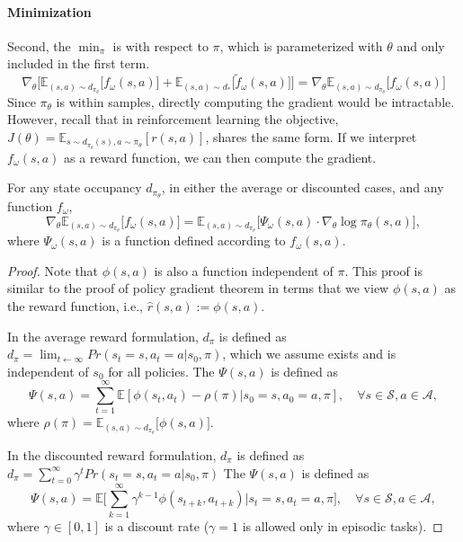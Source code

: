 \paragraph{Minimization} Second, the $\min_{\pi}$ is with respect to $\pi$, which is parameterized with $\theta$ and only included in the first term.
\begin{equation*}
\nabla_{\theta} \Big[ \mathbb{E}_{(s, a)\sim d_{\pi_{\theta}}} \big[ f_{\omega}(s, a) \big] + \mathbb{E}_{(s, a)\sim d_*} \big[ \tilde{f}_{\omega}(s, a) \big] \Big]
= \nabla_{\theta} \mathbb{E}_{(s, a)\sim d_{\pi_{\theta}}} \big[ f_{\omega}(s, a) \big] 
\end{equation*}
Since $\pi_{\theta}$ is within samples, directly computing the gradient would be intractable. However, recall that in reinforcement learning the objective, $J(\theta)=\mathbb{E}_{s\sim d_{\pi_{\theta}}(s), a\sim\pi_{\theta}}[r(s, a)]$, shares the same form. If we interpret $f_{\omega}(s, a)$ as a reward function, we can then compute the gradient. 
\begin{theorem}\label{theo:policy_gradient}
For any state occupancy $d_{\pi_{\theta}}$, in either the average or discounted cases, and any function $f_{\omega}$, 
\begin{equation*}
\nabla_\theta \mathbb{E}_{(s, a)\sim d_{\pi_{\theta}}}\big[ f_{\omega}(s, a) \big] = \mathbb{E}_{(s, a)\sim d_{\pi_{\theta}}} \big[ \Psi_{\omega}(s, a) \cdot \nabla_\theta \log \pi_{\theta}(s, a) \big], 
\end{equation*}
where $\Psi_{\omega}(s, a)$ is a function defined according to $f_{\omega}(s, a)$. 
\end{theorem}

\begin{proof}
Note that $\phi(s, a)$ is also a function independent of $\pi$. 
This proof is similar to the proof of policy gradient theorem in terms that we view $\phi(s, a)$ as the reward function, i.e., $\hat{r}(s, a) := \phi(s, a)$. 

In the average reward formulation, $d_\pi$ is defined as $d_{\pi}=\lim_{t\leftarrow\infty}Pr(s_t=s, a_t=a|s_0, \pi)$, which we assume exists and is independent of $s_0$ for all policies. 
The $\Psi(s, a)$ is defined as 
\begin{equation*}
\Psi(s, a) = \sum_{t=1}^{\infty} \mathbb{E}[\phi(s_t, a_t) - \rho(\pi) | s_0 = s, a_0 =a, \pi], \quad \forall s\in\mathcal{S}, a\in\mathcal{A}, 
\end{equation*}
where $\rho(\pi) = \mathbb{E}_{(s, a)\sim d_{\pi_{\theta}}}\big[ \phi(s, a) \big] $. 

In the discounted reward formulation, $d_\pi$ is defined as $d_{\pi}=\sum_{t=0}^{\infty}\gamma^t Pr(s_t=s, a_t=a|s_0, \pi)$
The $\Psi(s, a)$ is defined as 
\begin{equation*}
\Psi(s, a) = \mathbb{E}\big[ \sum_{k=1}^{\infty} \gamma^{k-1} \phi(s_{t+k}, a_{t+k}) | s_t = s, a_t =a, \pi \big], \quad \forall s\in\mathcal{S}, a\in\mathcal{A}, 
\end{equation*}
where $\gamma\in[0, 1]$ is a discount rate ($\gamma=1$ is allowed only in episodic tasks). 
\end{proof}

